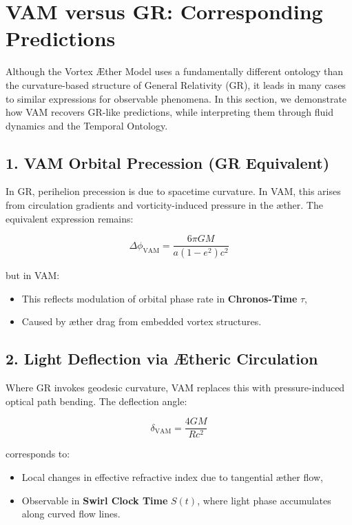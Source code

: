 \section{VAM versus GR: Corresponding Predictions}
\label{sec:vam-versus-gr-corresponding-predictions}

Although the Vortex \AE ther Model uses a fundamentally different ontology than the curvature-based structure of General Relativity (GR), it leads in many cases to similar expressions for observable phenomena. In this section, we demonstrate how VAM recovers GR-like predictions, while interpreting them through fluid dynamics and the Temporal Ontology.

\subsection*{1. VAM Orbital Precession (GR Equivalent)}

In GR, perihelion precession is due to spacetime curvature. In VAM, this arises from circulation gradients and vorticity-induced pressure in the \ae ther. The equivalent expression remains:

\[
    \Delta\phi_{\text{VAM}} = \frac{6\pi G M}{a(1 - e^2) c^2}
\]

but in VAM:
\begin{itemize}
    \item This reflects modulation of orbital phase rate in \textbf{Chronos-Time} \( \tau \),
    \item Caused by \ae ther drag from embedded vortex structures.
\end{itemize}

\subsection*{2. Light Deflection via Ætheric Circulation}

Where GR invokes geodesic curvature, VAM replaces this with pressure-induced optical path bending. The deflection angle:

\[
    \delta_{\text{VAM}} = \frac{4 G M}{R c^2}
\]

corresponds to:
\begin{itemize}
    \item Local changes in effective refractive index due to tangential \ae ther flow,
    \item Observable in \textbf{Swirl Clock Time} \( S(t) \), where light phase accumulates along curved flow lines.
\end{itemize}

